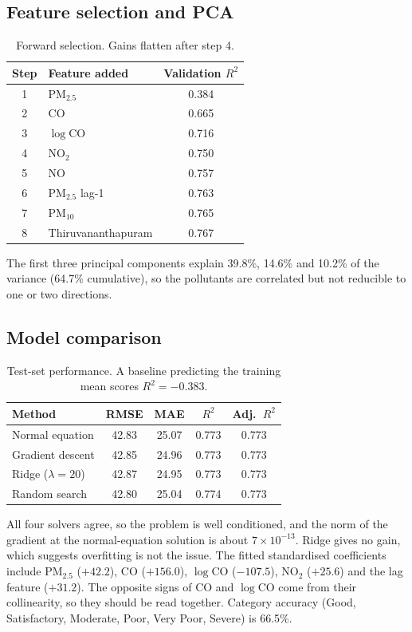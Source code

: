 \documentclass[11pt,a4paper]{article}
\begin{document}
\subsection{Feature selection and PCA}
\begin{table}[H]
\centering
\begin{tabular}{@{}clc@{}}
\toprule
Step & Feature added & Validation $R^2$ \\ \midrule
1 & PM$_{2.5}$ & 0.384 \\ 2 & CO & 0.665 \\ 3 & $\log$CO & 0.716 \\ 4 & NO$_2$ & 0.750 \\
5 & NO & 0.757 \\ 6 & PM$_{2.5}$ lag-1 & 0.763 \\ 7 & PM$_{10}$ & 0.765 \\ 8 & Thiruvananthapuram & 0.767 \\ \bottomrule
\end{tabular}
\caption{Forward selection. Gains flatten after step 4.}
\end{table}
The first three principal components explain 39.8\%, 14.6\% and 10.2\% of the variance (64.7\% cumulative), so the pollutants are correlated but not reducible to one or two directions.

\subsection{Model comparison}
\begin{table}[H]
\centering
\begin{tabular}{@{}lcccc@{}}
\toprule
Method & RMSE & MAE & $R^2$ & Adj.\ $R^2$ \\ \midrule
Normal equation & 42.83 & 25.07 & 0.773 & 0.773 \\
Gradient descent & 42.85 & 24.96 & 0.773 & 0.773 \\
Ridge ($\lambda=20$) & 42.87 & 24.95 & 0.773 & 0.773 \\
Random search & 42.80 & 25.04 & 0.774 & 0.773 \\ \bottomrule
\end{tabular}
\caption{Test-set performance. A baseline predicting the training mean scores $R^2=-0.383$.}
\end{table}
All four solvers agree, so the problem is well conditioned, and the norm of the gradient at the normal-equation solution is about $7\times10^{-13}$. Ridge gives no gain, which suggests overfitting is not the issue. The fitted standardised coefficients include PM$_{2.5}$ ($+42.2$), CO ($+156.0$), $\log$CO ($-107.5$), NO$_2$ ($+25.6$) and the lag feature ($+31.2$). The opposite signs of CO and $\log$CO come from their collinearity, so they should be read together. Category accuracy (Good, Satisfactory, Moderate, Poor, Very Poor, Severe) is 66.5\%.
\end{document}
